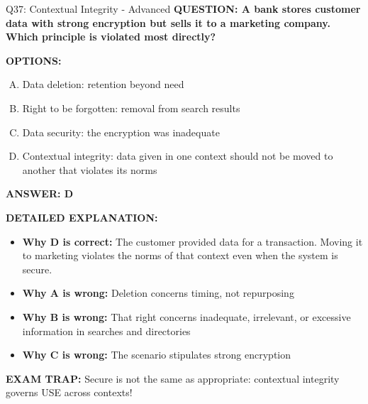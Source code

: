 \documentclass[8pt]{beamer}
\begin{document}
\begin{frame}[shrink=6]{Q37: Contextual Integrity - Advanced}
\fontsize{6.5}{7.5}\selectfont
\textbf{QUESTION: A bank stores customer data with strong encryption but sells it to a marketing company. Which principle is violated most directly?}

\vspace{0.1cm}
\textbf{OPTIONS:}
\begin{enumerate}[A.]
\item Data deletion: retention beyond need
\item Right to be forgotten: removal from search results
\item Data security: the encryption was inadequate
\item Contextual integrity: data given in one context should not be moved to another that violates its norms
\end{enumerate}

\vspace{0.1cm}
\textcolor{myblue}{\textbf{ANSWER: D}}

\vspace{0.1cm}
\textbf{DETAILED EXPLANATION:}
\begin{itemize}
\item \textbf{Why D is correct:} The customer provided data for a transaction. Moving it to marketing violates the norms of that context even when the system is secure.
\item \textbf{Why A is wrong:} Deletion concerns timing, not repurposing
\item \textbf{Why B is wrong:} That right concerns inadequate, irrelevant, or excessive information in searches and directories
\item \textbf{Why C is wrong:} The scenario stipulates strong encryption
\end{itemize}

\textcolor{myred}{\textbf{EXAM TRAP:}} Secure is not the same as appropriate: contextual integrity governs USE across contexts!
\end{frame}
\end{document}
